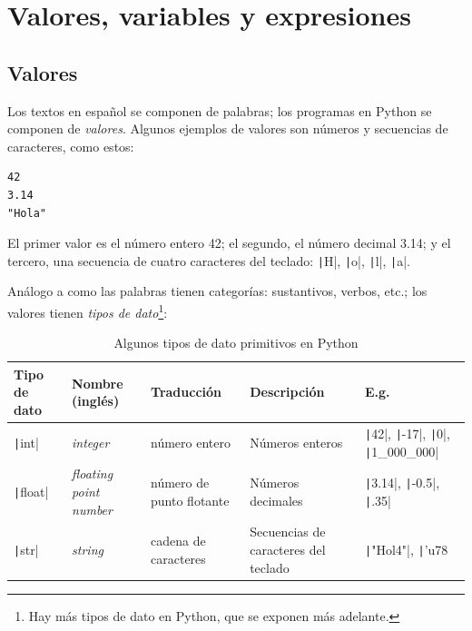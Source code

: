 \section{Valores, variables y expresiones}

\subsection{Valores}

Los textos en español se componen de palabras; los programas en Python se componen de \emph{valores}. Algunos ejemplos de valores son números y secuencias de caracteres, como estos:
\begin{verbatim}
42
3.14
"Hola"
\end{verbatim}
El primer valor es el número entero 42; el segundo, el número decimal 3.14; y el tercero, una secuencia de cuatro caracteres del teclado: \texttt|H|, \texttt|o|, \texttt|l|, \texttt|a|.

Análogo a como las palabras tienen categorías: sustantivos, verbos, etc.; los valores tienen \emph{tipos de dato}\footnote{Hay más tipos de dato en Python, que se exponen más adelante.}:

\begin{table}[h]
\centering
\footnotesize
\begin{tabular}{|l|l|l|p{3.5cm}|l|}
\hline
\textbf{Tipo de dato} & \textbf{Nombre (inglés)} & \textbf{Traducción} & \textbf{Descripción} & \textbf{E.g.} \\
\hline
\texttt|int| & \textit{integer} & número entero & Números enteros & \texttt|42|, \texttt|-17|, \texttt|0|, \texttt|1_000_000| \\
\hline
\texttt|float| & \textit{floating point number} & número de punto flotante & Números decimales & \texttt|3.14|, \texttt|-0.5|, \texttt|.35| \\
\hline
\texttt|str| & \textit{string} & cadena de caracteres\footnotemark & Secuencias de caracteres del teclado & \texttt|"Hol4"|, \texttt|'u78%
\hline
\end{tabular}
\normalsize
\caption{Algunos tipos de dato primitivos en Python}
\label{tab:tipos-dato}
\end{table}

